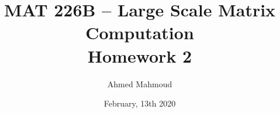 \documentclass[12pt] {article}
\begin{document}
\title{MAT 226B – Large Scale Matrix Computation \\ Homework 2}
\author{Ahmed Mahmoud}
\date{February, 13th 2020} 

\maketitle











\end{document}
